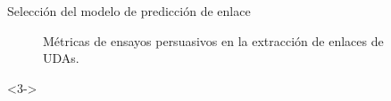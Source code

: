 \documentclass{beamer}
\begin{document}
\begin{frame}{Selección del modelo de predicción de enlace}
\begin{onlyenv}
\begin{figure}
            \caption{Métricas de ensayos persuasivos en la extracción de enlaces de UDAs.}
        \end{figure}
    \end{onlyenv}
    \begin{onlyenv}<3->
        \begin{table}
            \begin{center}
            \caption{Métricas de predicción de relaciones de las pruebas del predictor de enlace.}\label{table:test_relation_metrics_link_predictor}
            \end{center}
        \end{table}
    \end{onlyenv}
\end{frame}
\end{document}
